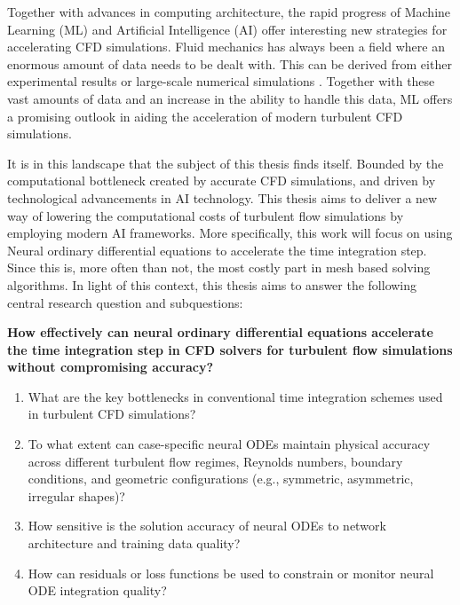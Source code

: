 Together with advances in computing architecture, the rapid progress of Machine Learning (ML) and Artificial Intelligence (AI) offer interesting new strategies for accelerating CFD simulations. Fluid mechanics has always been a field where an enormous amount of data needs to be dealt with. This can be derived from either experimental results or large-scale numerical simulations \cite{Brunton2020}. Together with these vast amounts of data and an increase in the ability to handle this data, ML offers a promising outlook in aiding the acceleration of modern turbulent CFD simulations.

It is in this landscape that the subject of this thesis finds itself. Bounded by the computational bottleneck created by accurate CFD simulations, and driven by technological advancements in AI technology. This thesis aims to deliver a new way of lowering the computational costs of turbulent flow simulations by employing modern AI frameworks. More specifically, this work will focus on using Neural ordinary differential equations to accelerate the time integration step. Since this is, more often than not, the most costly part in mesh based solving algorithms. In light of this context, this thesis aims to answer the following central research question and subquestions:


\begin{center}
\begin{minipage}{0.9\textwidth}
\begin{tcolorbox}[colback=gray!5,colframe=black!80,title=Research Question]
\textbf{How effectively can neural ordinary differential equations accelerate the time integration step in CFD solvers for turbulent flow simulations without compromising accuracy?}

\begin{enumerate}
  \item What are the key bottlenecks in conventional time integration schemes used in turbulent CFD simulations?
  
  \item To what extent can case-specific neural ODEs maintain physical accuracy across different turbulent flow regimes, Reynolds numbers, boundary conditions, and geometric configurations (e.g., symmetric, asymmetric, irregular shapes)?
  
  \item How sensitive is the solution accuracy of neural ODEs to network architecture and training data quality? 
  
  \item How can residuals or loss functions be used to constrain or monitor neural ODE integration quality?
  
\end{enumerate}
\end{tcolorbox}
\end{minipage}
\end{center}
